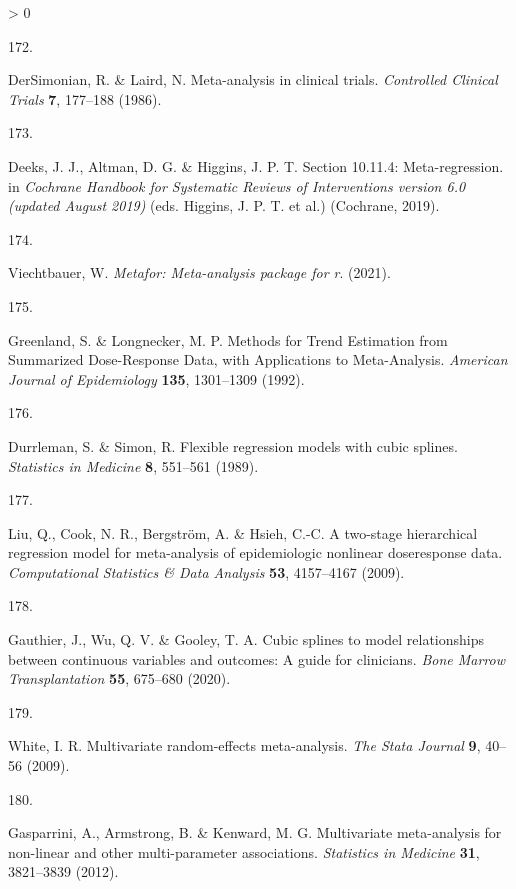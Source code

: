 \documentclass[a4paper, twoside]{templates/ociamthesis}
\newlength{\cslhangindent}
\newlength{\csllabelwidth}
\newenvironment{CSLReferences}[3] %
 {%
  \setlength{\parindent}{0pt}
  \ifodd #1 \everypar{\setlength{\hangindent}{\cslhangindent}}\ignorespaces\fi
  \ifnum #2 > 0
  \setlength{\parskip}{#2\baselineskip}
  \fi
 }%
 {}
\newcommand{\CSLLeftMargin}[1]{\parbox[t]{\maxof{\widthof{#1}}{\csllabelwidth}}{#1}}
\newcommand{\CSLRightInline}[1]{\parbox[t]{\linewidth - \csllabelwidth}{#1}}
\begin{document}
\begin{CSLReferences}{0}{0}
\leavevmode\hypertarget{ref-dersimonian1986}{}%
\CSLLeftMargin{172. }
\CSLRightInline{DerSimonian, R. \& Laird, N. Meta-analysis in clinical trials. \emph{Controlled Clinical Trials} \textbf{7}, 177--188 (1986).}

\leavevmode\hypertarget{ref-deeks2019}{}%
\CSLLeftMargin{173. }
\CSLRightInline{Deeks, J. J., Altman, D. G. \& Higgins, J. P. T. Section 10.11.4: Meta-regression. in \emph{Cochrane {Handbook} for {Systematic Reviews} of {Interventions} version 6.0 (updated {August} 2019)} (eds. Higgins, J. P. T. et al.) ({Cochrane}, 2019).}

\leavevmode\hypertarget{ref-R-metafor}{}%
\CSLLeftMargin{174. }
\CSLRightInline{Viechtbauer, W. \emph{Metafor: Meta-analysis package for r}. (2021).}

\leavevmode\hypertarget{ref-greenland1992}{}%
\CSLLeftMargin{175. }
\CSLRightInline{Greenland, S. \& Longnecker, M. P. Methods for {Trend Estimation} from {Summarized Dose}-{Response Data}, with {Applications} to {Meta}-{Analysis}. \emph{American Journal of Epidemiology} \textbf{135}, 1301--1309 (1992).}

\leavevmode\hypertarget{ref-durrleman1989}{}%
\CSLLeftMargin{176. }
\CSLRightInline{Durrleman, S. \& Simon, R. Flexible regression models with cubic splines. \emph{Statistics in Medicine} \textbf{8}, 551--561 (1989).}

\leavevmode\hypertarget{ref-liu2009}{}%
\CSLLeftMargin{177. }
\CSLRightInline{Liu, Q., Cook, N. R., Bergström, A. \& Hsieh, C.-C. A two-stage hierarchical regression model for meta-analysis of epidemiologic nonlinear dose{}response data. \emph{Computational Statistics \& Data Analysis} \textbf{53}, 4157--4167 (2009).}

\leavevmode\hypertarget{ref-gauthier2020}{}%
\CSLLeftMargin{178. }
\CSLRightInline{Gauthier, J., Wu, Q. V. \& Gooley, T. A. Cubic splines to model relationships between continuous variables and outcomes: A guide for clinicians. \emph{Bone Marrow Transplantation} \textbf{55}, 675--680 (2020).}

\leavevmode\hypertarget{ref-white2009}{}%
\CSLLeftMargin{179. }
\CSLRightInline{White, I. R. Multivariate random-effects meta-analysis. \emph{The Stata Journal} \textbf{9}, 40--56 (2009).}

\leavevmode\hypertarget{ref-gasparrini2012}{}%
\CSLLeftMargin{180. }
\CSLRightInline{Gasparrini, A., Armstrong, B. \& Kenward, M. G. Multivariate meta-analysis for non-linear and other multi-parameter associations. \emph{Statistics in Medicine} \textbf{31}, 3821--3839 (2012).}


\end{CSLReferences}
\end{document}

